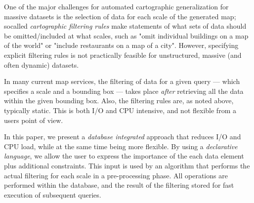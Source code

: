 One of the major challenges for automated cartographic generalization for massive datasets is the selection of data for each scale of the generated map; socalled \emph{cartographic filtering rules} make statements of what sets of data should be omitted/included at what scales, such as "omit individual buildings on a map of the world" or "include restaurants on a map of a city". However, specifying explicit filtering rules is not practically feasible for unstructured, massive (and often dynamic) datasets.
 


In many current map services, the filtering of data for a given query --- which specifies a scale and a bounding box --- takes place \emph{after} retrieving all the data within the given bounding box. Also, the filtering rules are, as noted above, typically static. This is both I/O and CPU intensive, and not flexible from a users point of view.

In this paper, we present a \emph{database integrated} approach that reduces I/O and CPU load, while at the same time being more flexible. By using a \emph{declarative language}, we allow the user to express the importance of the each data element plus additional constraints. This input is used by an algorithm that performs the actual filtering for each scale in a pre-processing phase. All operations are performed within the database, and the result of the filtering stored for fast execution of subsequent queries.







